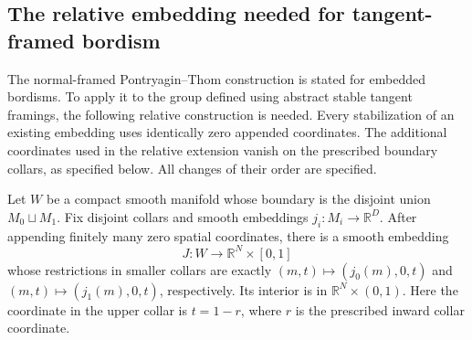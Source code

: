 
\subsection{The relative embedding needed for tangent-framed bordism}
\label{courseIII:pt-relative-embedding-setup}

The normal-framed Pontryagin--Thom construction is stated for embedded
bordisms.  To apply it to the group defined using abstract stable tangent
framings, the following relative construction is needed.  Every
stabilization of an existing embedding uses identically zero appended
coordinates.  The additional coordinates used in the relative extension
vanish on the prescribed boundary collars, as specified below.  All
changes of their order are specified.

\begin{lemma}
\label{courseIII:pt-relative-embedding}
Let $W$ be a compact smooth manifold whose boundary is the disjoint union
$M_0\sqcup M_1$.  Fix disjoint collars and smooth embeddings
$j_i:M_i\longrightarrow\mathbb R^D$.  After appending finitely many zero
spatial coordinates, there is a smooth embedding
\[
 J:W\longrightarrow\mathbb R^N\times[0,1]
\]
whose restrictions in smaller collars are exactly
$(m,t)\mapsto(j_0(m),0,t)$ and
$(m,t)\mapsto(j_1(m),0,t)$, respectively.  Its interior is in
$\mathbb R^N\times(0,1)$.  Here the coordinate in the upper collar is
$t=1-r$, where $r$ is the prescribed inward collar coordinate.
\end{lemma}

